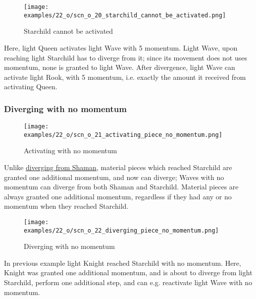 \vspace*{-0.9\baselineskip}
\noindent
\begin{wrapfigure}[11]{l}{0.4\textwidth} %
\centering
\texttt{[image: examples/22\_o/scn\_o\_20\_starchild\_cannot\_be\_activated.png]}
\vspace*{-0.4\baselineskip}
\caption{Starchild cannot be activated}
\label{fig:scn_o_20_starchild_cannot_be_activated}
\end{wrapfigure}
Here, light Queen activates light Wave with 5 momentum. Light Wave, upon reaching
light Starchild has to diverge from it; since its movement does not uses momentum,
none is granted to light Wave. After divergence, light Wave can activate light Rook,
with 5 momentum, i.e. exactly the amount it received from activating Queen.

\vspace*{-1.1\baselineskip}
\subsubsection*{Diverging with no momentum}
\label{sec:One/Starchild/Divergence/Diverging with no momentum}

\vspace*{-0.9\baselineskip}
\noindent
\begin{wrapfigure}[7]{l}{0.4\textwidth}
\centering
\texttt{[image: examples/22\_o/scn\_o\_21\_activating\_piece\_no\_momentum.png]}
\vspace*{-0.4\baselineskip}
\caption{Activating with no momentum}
\label{fig:scn_o_21_activating_piece_no_momentum}
\end{wrapfigure}
Unlike \hyperref[fig:scn_cot_13_diverging_activated_piece_init]{diverging from Shaman},
material pieces which reached Starchild are granted one additional momentum, and now can
diverge; Waves with no momentum can diverge from both Shaman and Starchild. \newline
\indent
Material pieces are always granted one additional momentum, regardless if they had any
or no momentum when they reached Starchild.

\clearpage %

\noindent
\begin{wrapfigure}[8]{l}{0.4\textwidth}
\centering
\texttt{[image: examples/22\_o/scn\_o\_22\_diverging\_piece\_no\_momentum.png]}
\vspace*{-0.4\baselineskip}
\caption{Diverging with no momentum}
\label{fig:scn_o_22_diverging_piece_no_momentum}
\end{wrapfigure}
In previous example light Knight reached Starchild with no momentum. Here, Knight
was granted one additional momentum, and is about to diverge from light Starchild,
perform one additional step, and can e.g. reactivate light Wave with no momentum.

